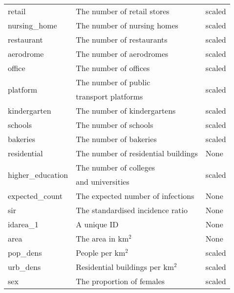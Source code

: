 \begin{table}[H]
\begin{tabular}{l l l}
retail & The number of retail stores & scaled \\
nursing\_home & The number of nursing homes & scaled \\
restaurant & The number of restaurants & scaled \\
aerodrome & The number of aerodromes & scaled \\
office & The number of offices & scaled \\
\multirow{2}{*}{platform} & The number of public & \multirow{2}{*}{scaled} \\
& transport platforms \\
kindergarten & The number of kindergartens & scaled \\
schools & The number of schools & scaled \\
bakeries & The number of bakeries & scaled \\
residential & The number of residential buildings & None \\
\multirow{2}{*}{higher\_education} & The number of colleges & \multirow{2}{*}{scaled} \\
& and universities \\
expected\_count & The expected number of infections & None \\
sir & The standardised incidence ratio & None \\
idarea\_1 & A unique ID & None \\
area & The area in km$^2$ & None \\
pop\_dens & People per km$^2$ & scaled\\
\multirow{1}{*}{urb\_dens} &  Residential buildings per km$^2$ & scaled \\
sex & The proportion of females & scaled \\
\bottomrule
\end{tabular}
\end{table}
